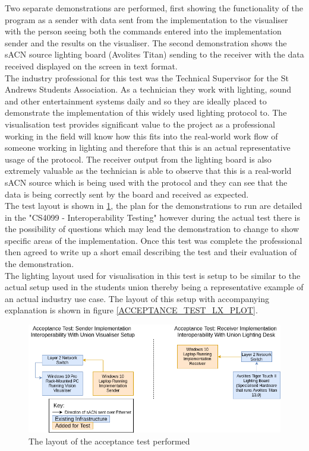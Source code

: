 \documentclass[11pt,a4paper]{article}
\begin{document}
Two separate demonstrations are performed, first showing the functionality of the program as a sender with data sent from the implementation to the visualiser with the person seeing both the commands entered into the implementation sender and the results on the visualiser. The second demonstration shows the sACN source lighting board (Avolites Titan) sending to the receiver with the data received displayed on the screen in text format. \\

The industry professional for this test was the Technical Supervisor for the St Andrews Students Association. As a technician they work with lighting, sound and other entertainment systems daily and so they are ideally placed to demonstrate the implementation of this widely used lighting protocol to. The visualisation test provides significant value to the project as a professional working in the field will know how this fits into the real-world work flow of someone working in lighting and therefore that this is an actual representative usage of the protocol. The receiver output from the lighting board is also extremely valuable as the technician is able to observe that this is a real-world sACN source which is being used with the protocol and they can see that the data is being correctly sent by the board and received as expected.  \\

The test layout is shown in \ref{ACCEPTANCE_TEST_LAYOUT}, the plan for the demonstrations to run are detailed in the "CS4099 - Interoperability Testing" however during the actual test there is the possibility of questions which may lead the demonstration to change to show specific areas of the implementation. Once this test was complete the professional then agreed to write up a short email describing the test and their evaluation of the demonstration.\\ 

The lighting layout used for visualisation in this test is setup to be similar to the actual setup used in the students union thereby being a representative example of an actual industry use case. The layout of this setup with accompanying explanation is shown in figure \ref{ACCEPTANCE_TEST_LX_PLOT}. 

\begin{figure}[H]
	\label{ACCEPTANCE_TEST_LAYOUT}
	\includegraphics[width=\textwidth]{CS4099-Acceptance-Test-Layout.png}
	\caption{The layout of the acceptance test performed}
\end{figure}
\end{document}
